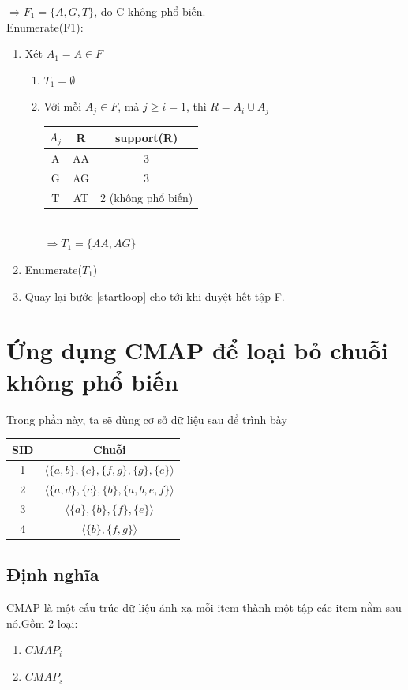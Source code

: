 \documentclass[a4paper 14pt]{article}
\begin{document}
			$\Rightarrow F_1 = \{A, G, T\}$, do C không phổ biến.\\
			Enumerate(F1):
			\begin{enumerate}
				\item Xét $A_1 = A \in F$ \label{startloop}
					\begin{enumerate}
							\item $T_1 = \emptyset$
							\item Với mỗi $A_j \in F$, mà $j \geq i = 1$, thì $R = A_i \cup A_j$\\ 
							\begin{tabular}{|c|c|c|}
								\hline
								$A_j$ & R & support(R) \\ \hline
								A & AA & 3\\ \hline
								G & AG & 3\\ \hline
								T & AT & 2 (không phổ biến)\\ \hline
							\end{tabular}\\
							$\Rightarrow T_1 = \{AA, AG\}$
					\end{enumerate}
				\item Enumerate($T_1$)
				\item Quay lại bước \ref{startloop} cho tới khi duyệt hết tập F.
			\end{enumerate}
			
			
	\section{Ứng dụng CMAP để loại bỏ chuỗi không phổ biến}
		Trong phần này, ta sẽ dùng cơ sở dữ liệu sau để trình bày
		\begin{table}[H]
			\begin{tabular}{| c | c |}
				\hline
				SID & Chuỗi\\ \hline
				1 & $\langle \{a,b\}, \{c\}, \{f,g\}, \{g\}, \{e\} \rangle$\\ \hline
				2 & $\langle \{a,d\}, \{c\}, \{b\}, \{a,b,e,f\} \rangle$\\ \hline
				3 & $\langle \{a\}, \{b\}, \{f\}, \{e\} \rangle$\\ \hline
				4 & $\langle \{b\}, \{f,g\}\rangle$\\ \hline
			\end{tabular}
		\end{table}
		\subsection{Định nghĩa}
			CMAP là một cấu trúc dữ liệu ánh xạ mỗi item thành một tập các item nằm sau nó.Gồm 2 loại:
			\begin{enumerate}
				\item $CMAP_i$
				\item $CMAP_s$
			\end{enumerate}
\end{document}
